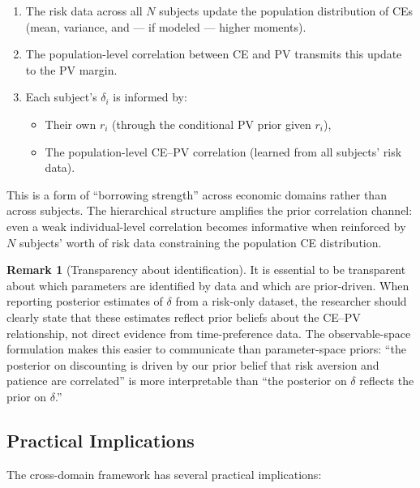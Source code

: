 \documentclass[11pt,a4paper]{article}
\theoremstyle{definition}
\newtheorem{remark}[theorem]{Remark}
\begin{document}
\begin{enumerate}
    \item The risk data across all $N$ subjects update the population
    distribution of CEs (mean, variance, and --- if modeled ---
    higher moments).

    \item The population-level correlation between CE and PV transmits this
    update to the PV margin.

    \item Each subject's $\delta_i$ is informed by:
    \begin{itemize}
        \item Their own $r_i$ (through the conditional PV prior given $r_i$),
        \item The population-level CE--PV correlation (learned from all
        subjects' risk data).
    \end{itemize}
\end{enumerate}

This is a form of ``borrowing strength'' across economic domains rather than
across subjects. The hierarchical structure amplifies the prior correlation
channel: even a weak individual-level correlation becomes informative when
reinforced by $N$ subjects' worth of risk data constraining the population
CE distribution.

\begin{remark}[Transparency about identification]
It is essential to be transparent about which parameters are identified by data
and which are prior-driven. When reporting posterior estimates of $\delta$ from
a risk-only dataset, the researcher should clearly state that these estimates
reflect prior beliefs about the CE--PV relationship, not direct evidence from
time-preference data. The observable-space formulation makes this easier to
communicate than parameter-space priors: ``the posterior on discounting is
driven by our prior belief that risk aversion and patience are correlated''
is more interpretable than ``the posterior on $\delta$ reflects the prior
on $\delta$.''
\end{remark}

\subsection{Practical Implications}

The cross-domain framework has several practical implications:
\end{document}
